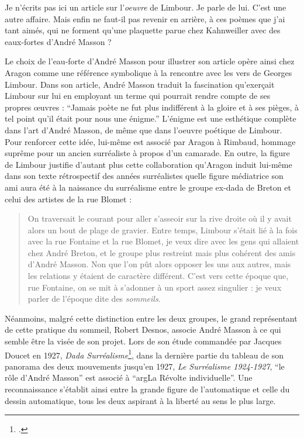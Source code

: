Je n’écrits pas ici un article sur l’\emph{oeuvre} de Limbour. Je parle de lui. C’est une autre affaire. Mais enfin ne faut-il pas revenir en arrière, à ces poèmes que j’ai tant aimés, qui ne forment qu’une plaquette parue chez Kahnweiller avec des eaux-fortes d’André Masson ?


	Le choix de l’eau-forte d’André Masson pour illustrer son article opère ainsi chez Aragon comme une référence symbolique à la rencontre avec les vers de Georges Limbour. Dans son article, André Masson traduit la fascination qu’exerçait Limbour sur lui en employant un terme qui pourrait rendre compte de ses propres œuvres : \enquote{Jamais poète ne fut plus indifférent à la gloire et à ses pièges, à tel point qu’il était pour nous une énigme.} L’énigme est une esthétique complète dans l’art d’André Masson, de même que dans l’oeuvre poétique de Limbour. Pour renforcer cette idée, lui-même est associé par Aragon à Rimbaud, hommage suprême pour un ancien surréaliste à propos d’un camarade. En outre, la figure de Limbour justifie d’autant plus cette collaboration qu’Aragon induit lui-même dans son texte rétrospectif des années surréalistes quelle figure médiatrice son ami aura été à la naissance du surréalisme entre le groupe ex-dada de Breton et celui des artistes de la rue Blomet : 

\begin{quote}
On traversait le courant pour aller s’asseoir sur la rive droite où il y avait alors un bout de plage de gravier. Entre temps, Limbour s’était lié à la fois avec la rue Fontaine et la rue Blomet, je veux dire avec les gens qui allaient chez André Breton, et le groupe plus restreint mais plus cohérent des amis d’André Masson. Non que l’on pût alors opposer les uns aux autres, mais les relations y étaient de caractère différent. C’est vers cette époque que, rue Fontaine, on se mit à s’adonner à un sport assez singulier : je veux parler de l’époque dite des \emph{sommeils}.	
\end{quote}


	Néanmoins, malgré cette distinction entre les deux groupes, le grand représentant de cette pratique du sommeil, Robert Desnos, associe André Masson à ce qui semble être la visée de son projet. Lors de son étude commandée par Jacques Doucet en 1927, \emph{Dada Surréalisme}\footcite[p152]{desnos}, dans la dernière partie du tableau de son panorama des deux mouvements jusqu’en 1927, \emph{Le Surréalisme 1924-1927}, \enquote{le rôle d’André Masson} est associé à \enquote{argLa Révolte individuelle}. Une reconnaissance s’établit ainsi entre la grande figure de l’automatique et celle du dessin automatique, tous les deux aspirant à la liberté au sens le plus large. 

